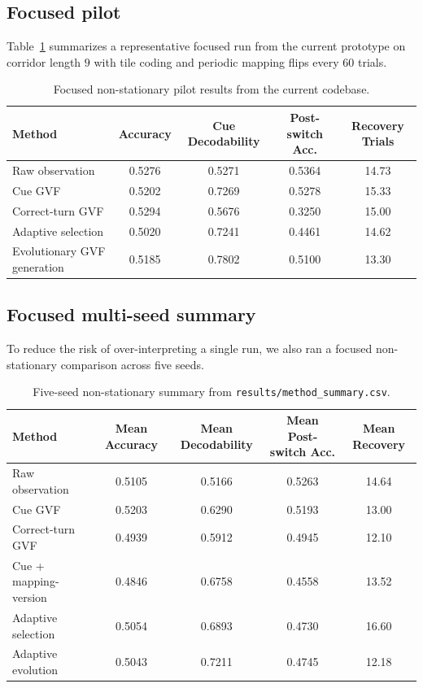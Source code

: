 \documentclass[11pt]{article}
\begin{document}
\subsection{Focused pilot}
Table~\ref{tab:pilot} summarizes a representative focused run from the current prototype on corridor length $9$ with tile coding and periodic mapping flips every $60$ trials.

\begin{table}[h]
\centering
\begin{tabular}{lcccc}
\toprule
Method & Accuracy & Cue Decodability & Post-switch Acc. & Recovery Trials \\
\midrule
Raw observation & 0.5276 & 0.5271 & 0.5364 & 14.73 \\
Cue GVF & 0.5202 & 0.7269 & 0.5278 & 15.33 \\
Correct-turn GVF & 0.5294 & 0.5676 & 0.3250 & 15.00 \\
Adaptive selection & 0.5020 & 0.7241 & 0.4461 & 14.62 \\
Evolutionary GVF generation & 0.5185 & 0.7802 & 0.5100 & 13.30 \\
\bottomrule
\end{tabular}
\caption{Focused non-stationary pilot results from the current codebase.}
\label{tab:pilot}
\end{table}

\subsection{Focused multi-seed summary}
To reduce the risk of over-interpreting a single run, we also ran a focused non-stationary comparison across five seeds.

\begin{table}[h]
\centering
\begin{tabular}{lcccc}
\toprule
Method & Mean Accuracy & Mean Decodability & Mean Post-switch Acc. & Mean Recovery \\
\midrule
Raw observation & 0.5105 & 0.5166 & 0.5263 & 14.64 \\
Cue GVF & 0.5203 & 0.6290 & 0.5193 & 13.00 \\
Correct-turn GVF & 0.4939 & 0.5912 & 0.4945 & 12.10 \\
Cue + mapping-version & 0.4846 & 0.6758 & 0.4558 & 13.52 \\
Adaptive selection & 0.5054 & 0.6893 & 0.4730 & 16.60 \\
Adaptive evolution & 0.5043 & 0.7211 & 0.4745 & 12.18 \\
\bottomrule
\end{tabular}
\caption{Five-seed non-stationary summary from \texttt{results/method\_summary.csv}.}
\label{tab:multiseed}
\end{table}
\end{document}
